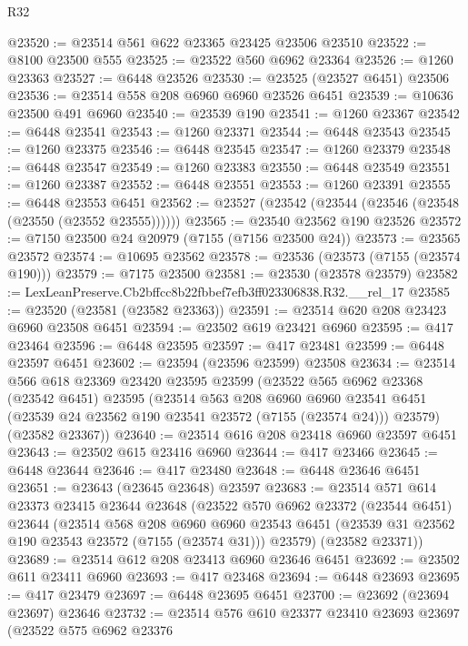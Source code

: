 \begin{lexlean}{R32}
\begin{coremodule}
@23520 := @23514 @561 @622 @23365 @23425 @23506 @23510
@23522 := @8100 @23500 @555
@23525 := @23522 @560 @6962 @23364
@23526 := @1260 @23363
@23527 := @6448 @23526
@23530 := @23525 (@23527 @6451) @23506
@23536 := @23514 @558 @208 @6960 @6960 @23526 @6451
@23539 := @10636 @23500 @491 @6960
@23540 := @23539 @190
@23541 := @1260 @23367
@23542 := @6448 @23541
@23543 := @1260 @23371
@23544 := @6448 @23543
@23545 := @1260 @23375
@23546 := @6448 @23545
@23547 := @1260 @23379
@23548 := @6448 @23547
@23549 := @1260 @23383
@23550 := @6448 @23549
@23551 := @1260 @23387
@23552 := @6448 @23551
@23553 := @1260 @23391
@23555 := @6448 @23553 @6451
@23562 := @23527 (@23542 (@23544 (@23546 (@23548 (@23550 (@23552 @23555))))))
@23565 := @23540 @23562 @190 @23526
@23572 := @7150 @23500 @24 @20979 (@7155 (@7156 @23500 @24))
@23573 := @23565 @23572
@23574 := @10695 @23562
@23578 := @23536 (@23573 (@7155 (@23574 @190)))
@23579 := @7175 @23500
@23581 := @23530 (@23578 @23579)
@23582 := LexLeanPreserve.Cb2bffcc8b22fbbef7efb3ff023306838.R32.__rel_17
@23585 := @23520 (@23581 (@23582 @23363))
@23591 := @23514 @620 @208 @23423 @6960 @23508 @6451
@23594 := @23502 @619 @23421 @6960
@23595 := @417 @23464
@23596 := @6448 @23595
@23597 := @417 @23481
@23599 := @6448 @23597 @6451
@23602 := @23594 (@23596 @23599) @23508
@23634 := @23514
    @566
    @618
    @23369
    @23420
    @23595
    @23599
    (@23522
      @565
      @6962
      @23368
      (@23542 @6451)
      @23595
      (@23514
        @563
        @208
        @6960
        @6960
        @23541
        @6451
        (@23539 @24 @23562 @190 @23541 @23572 (@7155 (@23574 @24)))
        @23579)
      (@23582 @23367))
@23640 := @23514 @616 @208 @23418 @6960 @23597 @6451
@23643 := @23502 @615 @23416 @6960
@23644 := @417 @23466
@23645 := @6448 @23644
@23646 := @417 @23480
@23648 := @6448 @23646 @6451
@23651 := @23643 (@23645 @23648) @23597
@23683 := @23514
    @571
    @614
    @23373
    @23415
    @23644
    @23648
    (@23522
      @570
      @6962
      @23372
      (@23544 @6451)
      @23644
      (@23514
        @568
        @208
        @6960
        @6960
        @23543
        @6451
        (@23539 @31 @23562 @190 @23543 @23572 (@7155 (@23574 @31)))
        @23579)
      (@23582 @23371))
@23689 := @23514 @612 @208 @23413 @6960 @23646 @6451
@23692 := @23502 @611 @23411 @6960
@23693 := @417 @23468
@23694 := @6448 @23693
@23695 := @417 @23479
@23697 := @6448 @23695 @6451
@23700 := @23692 (@23694 @23697) @23646
@23732 := @23514
    @576
    @610
    @23377
    @23410
    @23693
    @23697
    (@23522
      @575
      @6962
      @23376

\end{coremodule}
\end{lexlean}
